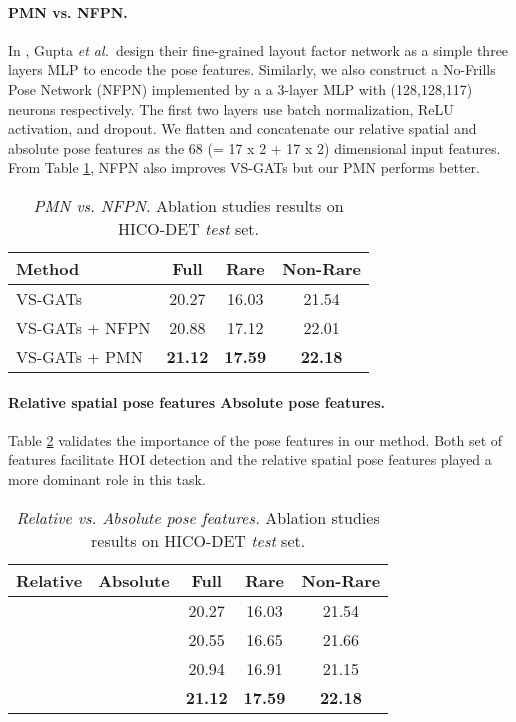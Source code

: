 \documentclass[10pt,twocolumn,letterpaper]{article}
\newcommand{\et}{{\em et al.\ }}
\begin{document}
\paragraph{\textbf{PMN vs. NFPN.}} 
In \cite{gupta2018nofrills}, Gupta \et design their fine-grained layout factor network as a simple three layers MLP to encode the pose features. Similarly, we also construct a No-Frills Pose Network (NFPN) implemented by a a 3-layer MLP with (128,128,117) neurons respectively. The first two layers use batch normalization, ReLU activation, and dropout. We flatten and concatenate our relative spatial and absolute pose features as the 68 (= 17 x 2 + 17 x 2) dimensional input features. From Table \ref{tbl:ablation1}, NFPN also improves VS-GATs but our PMN performs better. 
\begin{table}[h]
\centering
    \begin{tabular}{l|ccc}
Method              & Full  & Rare  & Non-Rare \\
    \midrule
    VS-GATs             & 20.27 & 16.03 & 21.54 \\
    VS-GATs + NFPN      & 20.88 & 17.12 & 22.01 \\
    VS-GATs + PMN      & \textbf{21.12} & \textbf{17.59} & \textbf{22.18 } \\
\end{tabular}
    \caption{\textit{PMN vs. NFPN.} Ablation studies results on HICO-DET \textit{test} set.}
    \label{tbl:ablation1}
\end{table}
\paragraph{\textbf{Relative spatial pose features \vs Absolute pose features.}} 
Table \ref{tbl:ablation2} validates the importance of the pose features in our method. Both set of features facilitate HOI detection and the relative spatial pose features played a more dominant role in this task. 
\begin{table}[h]
\centering
    \begin{tabular}{cc|ccc}
Relative    &   Absolute    & Full  & Rare  & Non-Rare \\
    \midrule
             &              & 20.27 & 16.03 & 21.54 \\
             &          & 20.55 & 16.65 & 21.66 \\
         &              & 20.94 & 16.91 & 21.15 \\
         &          & \textbf{21.12} & \textbf{17.59} & \textbf{22.18} \\
\end{tabular}
    \caption{\textit{Relative vs. Absolute pose features.} Ablation studies results on HICO-DET \textit{test} set.}
    \label{tbl:ablation2}
\end{table}
\end{document}
